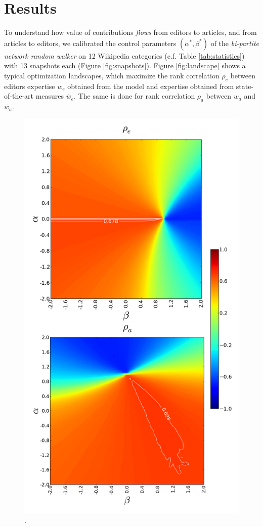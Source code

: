 \section{Results}
To understand how value of contributions {\it flows} from editors to articles, and from articles to editors, we calibrated the control parameters $(\alpha^*,\beta^*)$ of the {\it bi-partite network random walker} on 12 Wikipedia categories (c.f. Table \ref{tab:statistics}) with 13 snapshots each (Figure \ref{fig:snapshots}). Figure \ref{fig:landscape} shows a typical optimization landscapes, which maximize the rank correlation $\rho_e$ between editors expertise $w_{e}$ obtained from the model and expertise obtained from state-of-the-art measures $\bar{w}_e$. The same is done for rank correlation $\rho_a$ between $w_a$ and $\bar{w}_a$. 

\begin{figure}[!t]
\centering
\includegraphics[width=0.9\columnwidth]{../Figures/contour_fem_combined.png}.

\end{figure}
